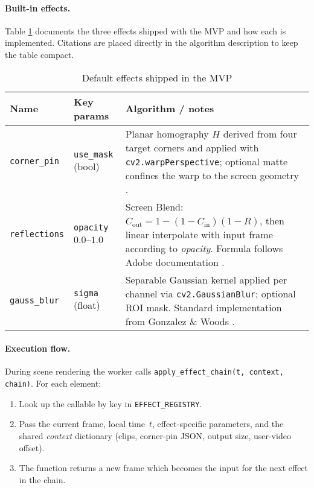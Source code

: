 \vspace{-0.6em}
\paragraph{Built-in effects.}
Table \ref{tab:effects} documents the three effects shipped with the MVP and
how each is implemented.  Citations are placed directly in the algorithm
description to keep the table compact.

\begin{table}[htbp]
\centering
\scriptsize
\caption{Default effects shipped in the MVP}
\label{tab:effects}
\begin{tabularx}{\textwidth}{@{}l l X@{}}
\toprule
\textbf{Name} & \textbf{Key params} & \textbf{Algorithm / notes} \\
\midrule
\texttt{corner\_pin} &
\texttt{use\_mask} (bool) &
Planar homography $H$ derived from four target corners and applied with
\texttt{cv2.warpPerspective}; optional matte confines the warp to the screen
geometry \cite{openCvHomography}. \\[0.25em]

\texttt{reflections} &
\texttt{opacity} $0{.}0$–$1{.}0$ &
Screen Blend: $C_\text{out}=1-(1-C_\text{in})(1-R)$, then linear interpolate
with input frame according to \textit{opacity}.  Formula follows Adobe
documentation \cite{adobeBlend}. \\[0.25em]

\texttt{gauss\_blur} &
\texttt{sigma} (float) &
Separable Gaussian kernel applied per channel via
\texttt{cv2.GaussianBlur}; optional ROI mask.  Standard implementation from
Gonzalez \& Woods \cite{gonzalez}. \\
\bottomrule
\end{tabularx}
\end{table}


\paragraph{Execution flow.}
During scene rendering the worker calls
\texttt{apply\_effect\_chain(t, context, chain)}.  
For each element:

\begin{enumerate}
  \item Look up the callable by key in \texttt{EFFECT\_REGISTRY}.  
  \item Pass the current frame, local time~$t$, effect-specific parameters,
        and the shared \textit{context} dictionary (clips, corner-pin JSON,
        output size, user-video offset).  
  \item The function returns a new frame which becomes the input for the next
        effect in the chain.
\end{enumerate}

